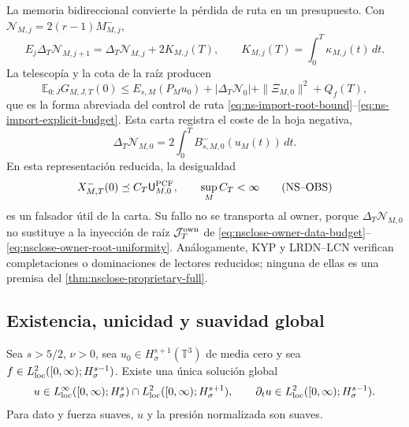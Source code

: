 La memoria bidireccional convierte la pérdida de ruta en un presupuesto. Con
\(\mathcal N_{M,j}=2(r-1)M_{M,j}^-\),
\begin{equation}
 E_j\Delta_T\mathcal N_{M,j+1}
 =\Delta_T\mathcal N_{M,j}+2K_{M,j}(T),
 \qquad
 K_{M,j}(T)=\int_0^T\kappa_{M,j}(t)\,dt.
 \label{eq:nsclose-carry-memory-telescope}
\end{equation}
La telescopía y la cota de la raíz producen
\begin{equation}
 \mathbb E_{0:J}G_{M,J,T}(0)
 \le E_{s,M}(P_Mu_0)+|\Delta_T\mathcal N_0|
 +\|\Xi_{M,0}\|^2+Q_f(T),
 \label{eq:nsclose-owner-terminal-bound}
\end{equation}
que es la forma abreviada del control de ruta
\eqref{eq:ns-import-root-bound}--\eqref{eq:ns-import-explicit-budget}. Esta
carta registra el coste de la hoja negativa,
\[
 \Delta_T\mathcal N_{M,0}
 =2\int_0^T B^-_{s,M,0}(u_M(t))\,dt.
\]
En esta representación reducida, la desigualdad
\[
 X^-_{M,T}(0)\preceq C_T\mathsf U^{\rm PCF}_{M,0},
 \qquad \sup_M C_T<\infty
 \tag{NS--OBS}
\]
es un falsador útil de la carta. Su fallo no se transporta al owner, porque
\(\Delta_T\mathcal N_{M,0}\) no sustituye a la inyección de raíz
\(\mathcal J_T^{\rm own}\) de
\eqref{eq:nsclose-owner-data-budget}--\eqref{eq:nsclose-owner-root-uniformity}.
Análogamente, KYP y LRDN--LCN verifican completaciones o dominaciones de
lectores reducidos; ninguna de ellas es una premisa del
\cref{thm:nsclose-proprietary-full}.

\subsection{Existencia, unicidad y suavidad global}

\begin{theorem}
\label{thm:nsclose-global-smooth}
\label{thm:realizaciones-ns}
Sea \(s>5/2\), \(\nu>0\), sea
\(u_0\in H^{s+1}_\sigma(\mathbb T^3)\) de media cero y sea
\(f\in L^2_{\rm loc}([0,\infty);H^{s-1}_\sigma)\). Existe una única solución
global
\begin{equation}
 u\in L^\infty_{\rm loc}([0,\infty);H^s_\sigma)
 \cap L^2_{\rm loc}([0,\infty);H^{s+1}_\sigma),
 \qquad
 \partial_tu\in L^2_{\rm loc}([0,\infty);H^{s-1}_\sigma).
 \label{eq:nsclose-global-regularity-class}
\end{equation}
Para dato y fuerza suaves, \(u\) y la presión normalizada son suaves.
\end{theorem}

